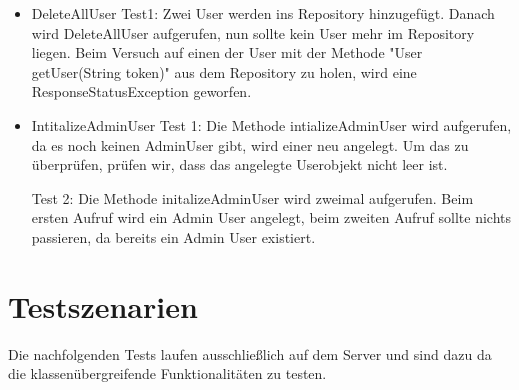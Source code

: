 \documentclass[a4paper]{scrreprt}
\begin{document}
\begin{itemize}
\begin{itemize}
\item DeleteAllUser
Test1: Zwei User werden ins Repository hinzugefügt. Danach wird DeleteAllUser aufgerufen, nun sollte kein User mehr im Repository liegen. Beim Versuch auf einen der User mit der Methode "User getUser(String token)" aus dem Repository zu holen, wird eine ResponseStatusException geworfen. 

\item IntitalizeAdminUser
Test 1: Die Methode intializeAdminUser wird aufgerufen, da es noch keinen AdminUser gibt, wird einer neu angelegt. Um das zu überprüfen, prüfen wir, dass das angelegte Userobjekt nicht leer ist.

Test 2: Die Methode initalizeAdminUser wird zweimal aufgerufen. Beim ersten Aufruf wird ein Admin User angelegt, beim zweiten Aufruf sollte nichts passieren, da bereits ein Admin User existiert. 
\end{itemize}
\end{itemize}

\section{Testszenarien}

Die nachfolgenden Tests laufen ausschließlich auf dem Server und sind dazu da die klassenübergreifende Funktionalitäten zu testen.\\
\end{document}
